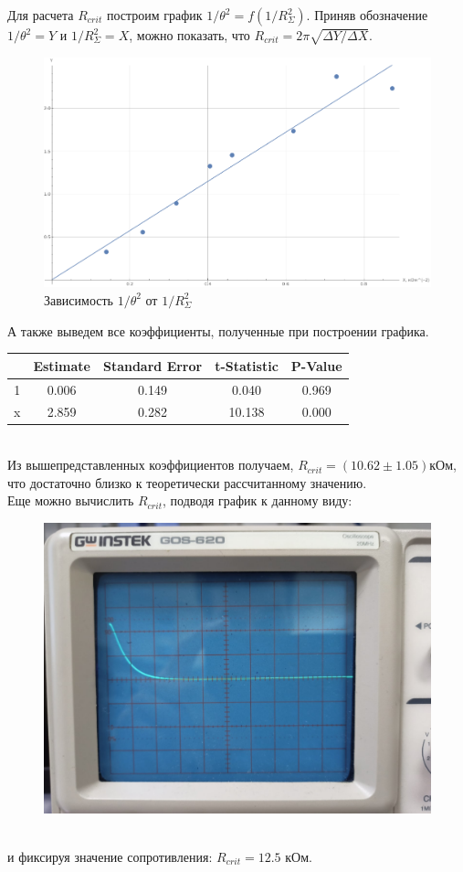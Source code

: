 \documentclass[a4paper,12pt]{article} %
\begin{document}
Для расчета $R_{crit}$ построим график $1/\theta^2 = f(1/R^2_{\Sigma})$. Приняв обозначение $1/\theta^2 = Y$ и $1/R^2_{\Sigma} = X$, можно показать, что $R_{crit} = 2\pi\sqrt{\Delta Y/\Delta X}$.
\newpage
\begin{figure}[h!]
\begin{center}
\includegraphics[width = 0.8\linewidth]{3.png}
\caption{Зависимость $1/\theta^2$ от $1/R^2_{\Sigma}$}
\end{center}
\end{figure}
А также выведем все коэффициенты, полученные при построении графика.\\
\begin{table}[h!]
\begin{center}
\begin{tabular}{|c|c|c|c|c|}
\hline
  & Estimate & Standard Error & t-Statistic & P-Value \\ \hline
1 & 0.006    & 0.149          & 0.040       & 0.969   \\ \hline
x & 2.859    & 0.282          & 10.138      & 0.000   \\ \hline
\end{tabular}
\end{center}
\end{table}\\
Из вышепредставленных коэффициентов получаем, $R_{crit} = (10.62 \pm 1.05)$кОм, что достаточно близко к теоретически рассчитанному значению.\\
Еще можно вычислить $R_{crit}$, подводя график к данному виду:\\
\begin{figure}[h!]
\begin{center}
\includegraphics[width = 0.45\linewidth]{1.jpg}
\end{center}
\end{figure}\\
и фиксируя значение сопротивления: $R_{crit} = 12.5$ кОм.
\end{document}
